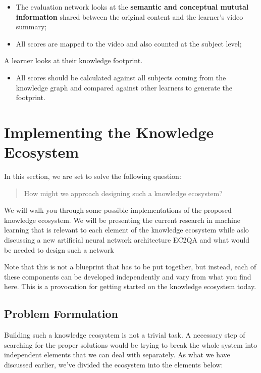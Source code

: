 \documentclass[]{book}
\providecommand{\tightlist}{%
  \setlength{\itemsep}{0pt}\setlength{\parskip}{0pt}}
\theoremstyle{definition}
\theoremstyle{definition}
\theoremstyle{definition}
\theoremstyle{remark}
\begin{document}
\begin{itemize}
\item
  The evaluation network looks at the \textbf{semantic and conceptual
  mututal information} shared between the original content and the
  learner's video summary;
\item
  All scores are mapped to the video and also counted at the subject
  level;
\end{itemize}

A learner looks at their knowledge footprint.

\begin{itemize}
\tightlist
\item
  All scores should be calculated against all subjects coming from the
  knowledge graph and compared against other learners to generate the
  footprint.
\end{itemize}

\chapter{Implementing the Knowledge
Ecosystem}\label{implementing-the-knowledge-ecosystem}

In this section, we are set to solve the following question:

\begin{quote}
How might we approach designing such a knowledge ecosystem?
\end{quote}

We will walk you through some possible implementations of the proposed
knowledge ecosystem. We will be presenting the current research in
machine learning that is relevant to each element of the knowledge
ecosystem while aslo discussing a new artificial neural network
architecture EC2QA and what would be needed to design such a network

Note that this is not a blueprint that has to be put together, but
instead, each of these components can be developed independently and
vary from what you find here. This is a provocation for getting started
on the knowledge ecosystem today.

\section{Problem Formulation}\label{problem-formulation}

Building such a knowledge ecosystem is not a trivial task. A necessary
step of searching for the proper solutions would be trying to break the
whole system into independent elements that we can deal with separately.
As what we have discussed earlier, we've divided the ecosystem into the
elements below:
\end{document}
